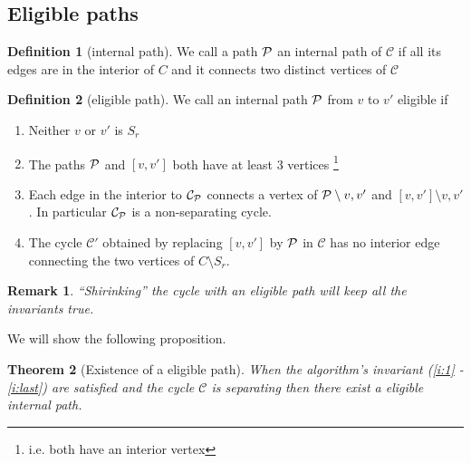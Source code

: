 \documentclass[a4paper]{article}
\newtheorem{thrm}{Theorem}
\newtheorem{remark}[thrm]{Remark}
\theoremstyle{definition}
\newtheorem*{defi}{Definition}
\newcommand{\scr}[1]{\mathcal{#1}}
\newcommand{\C}{\scr C}
\begin{document}
\subsection{Eligible paths}

\begin{defi}[internal path]
We call a path $\P$ an internal path of $\C$ if  all its edges are in the interior of $C$ and it connects two distinct vertices of $\C$ 
\end{defi}


\begin{defi}[eligible path]
We call an internal path $\P$ from $v$ to $v'$ eligible if 
\begin{enumerate}
 \renewcommand*{\labelenumi}{(E\arabic{enumi})}%
 \renewcommand*{\theenumi}{(E\arabic{enumi})}%


\item Neither $v$ or $v'$ is $S_r$ \label{e:notSr}
\item The paths $\P$ and $[v,v']$ both have at least 3 vertices \footnote{i.e. both have an interior vertex} \label{e:internalVertices}
\item Each edge in the interior to $\C_\P$ connects a vertex of $\P\setminus{v,v'}$ and $[v,v']\setminus{v,v'}$. In particular $\C_\P$ is a non-separating cycle.
\label{e:crossingedge}
\item The cycle $\C'$ obtained by replacing $[v,v']$ by $\P$ in $\C$ has no interior edge connecting the two vertices of $C\setminus{S_r}$.
\label{e:noChordinC'}
\end{enumerate}
\end{defi}

\begin{remark}
``Shirinking'' the cycle with an eligible path will keep all the invariants true.
\end{remark}

We will show the following proposition.

\begin{thrm}[Existence of a eligible path]
\label{th:eligExistence}
When the algorithm's invariant (\ref{i:1} - \ref{i:last}) are satisfied and the cycle $\C$ is separating then there exist a \emph{eligible} internal path.
\end{thrm}
\end{document}
